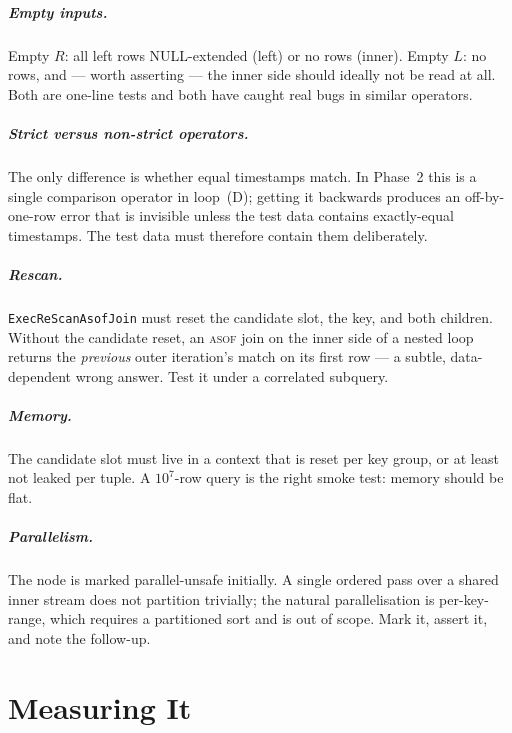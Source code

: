 \documentclass[11pt,a4paper]{report}
\theoremstyle{definition}
\theoremstyle{plain}
\newcommand{\code}[1]{\texttt{\small #1}}
\newcommand{\asof}{{\normalfont\scshape asof}}
\begin{document}
\paragraph{Empty inputs.} Empty $R$: all left rows NULL-extended (left) or no rows (inner).
Empty $L$: no rows, and --- worth asserting --- the inner side should ideally not be read at
all. Both are one-line tests and both have caught real bugs in similar operators.

\paragraph{Strict versus non-strict operators.} The only difference is whether equal
timestamps match. In Phase~2 this is a single comparison operator in loop~(D); getting it
backwards produces an off-by-one-row error that is invisible unless the test data contains
exactly-equal timestamps. The test data must therefore contain them deliberately.

\paragraph{Rescan.} \code{ExecReScanAsofJoin} must reset the candidate slot, the key, and
both children. Without the candidate reset, an \asof{} join on the inner side of a nested
loop returns the \emph{previous} outer iteration's match on its first row --- a subtle,
data-dependent wrong answer. Test it under a correlated subquery.

\paragraph{Memory.} The candidate slot must live in a context that is reset per key group,
or at least not leaked per tuple. A $10^7$-row query is the right smoke test: memory should
be flat.

\paragraph{Parallelism.} The node is marked parallel-unsafe initially. A single ordered pass
over a shared inner stream does not partition trivially; the natural parallelisation is
per-key-range, which requires a partitioned sort and is out of scope. Mark it, assert it,
and note the follow-up.


\chapter{Measuring It}\label{ch:measuring}
\end{document}
